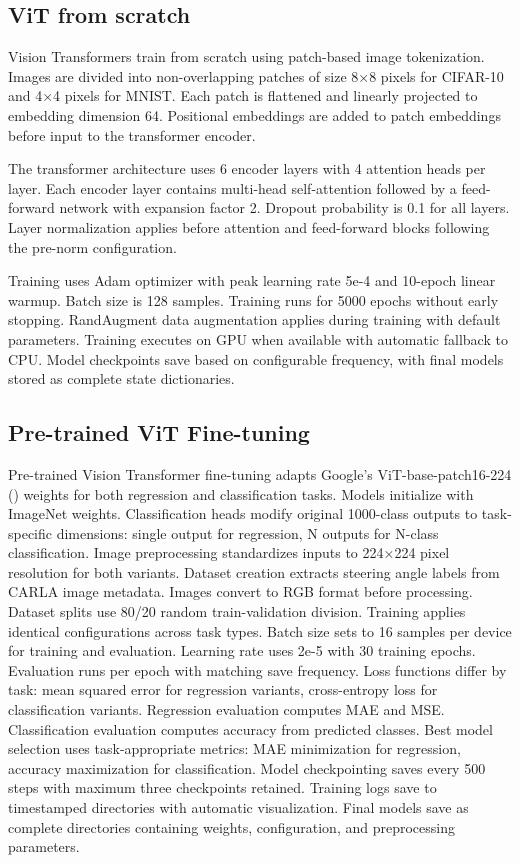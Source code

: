\subsection{ViT from scratch}
\label{methods:vit_from_scratch}
Vision Transformers train from scratch using patch-based image tokenization. Images are divided into non-overlapping patches of size 8×8 pixels for CIFAR-10 and 4×4 pixels for MNIST. Each patch is flattened and linearly projected to embedding dimension 64. Positional embeddings are added to patch embeddings before input to the transformer encoder.

The transformer architecture uses 6 encoder layers with 4 attention heads per layer. Each encoder layer contains multi-head self-attention followed by a feed-forward network with expansion factor 2. Dropout probability is 0.1 for all layers. Layer normalization applies before attention and feed-forward blocks following the pre-norm configuration.

Training uses Adam optimizer with peak learning rate 5e-4 and 10-epoch linear warmup. Batch size is 128 samples. Training runs for 5000 epochs without early stopping. RandAugment data augmentation applies during training with default parameters. Training executes on GPU when available with automatic fallback to CPU. Model checkpoints save based on configurable frequency, with final models stored as complete state dictionaries.

\subsection{Pre-trained ViT Fine-tuning}

Pre-trained Vision Transformer fine-tuning adapts Google's ViT-base-patch16-224 (\cite{google2021vitbasepatch16224}) weights for both regression and classification tasks. Models initialize with ImageNet weights. Classification heads modify original 1000-class outputs to task-specific dimensions: single output for regression, N outputs for N-class classification.
Image preprocessing standardizes inputs to 224×224 pixel resolution for both variants. Dataset creation extracts steering angle labels from CARLA image metadata. Images convert to RGB format before processing. Dataset splits use 80/20 random train-validation division.
Training applies identical configurations across task types. Batch size sets to 16 samples per device for training and evaluation. Learning rate uses 2e-5 with 30 training epochs. Evaluation runs per epoch with matching save frequency.
Loss functions differ by task: mean squared error for regression variants, cross-entropy loss for classification variants. Regression evaluation computes MAE and MSE. Classification evaluation computes accuracy from predicted classes. Best model selection uses task-appropriate metrics: MAE minimization for regression, accuracy maximization for classification.
Model checkpointing saves every 500 steps with maximum three checkpoints retained. Training logs save to timestamped directories with automatic visualization. Final models save as complete directories containing weights, configuration, and preprocessing parameters.

